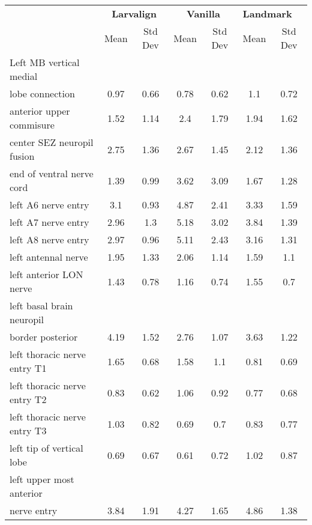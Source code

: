 \begin{tabular}{lcccccc}
\hline
 ﻿                                           & \multicolumn{2}{c}{\textbf{Larvalign}} & \multicolumn{2}{c}{\textbf{Vanilla}} & \multicolumn{2}{l}{\textbf{Landmark}} \\
                                             & Mean      & Std Dev  & Mean  & Std Dev  & Mean     & Std Dev  \\ \hline
 Left MB vertical medial\\ lobe connection   & 0.97      & 0.66 & 0.78    & 0.62 & 1.1      & 0.72 \\
 anterior upper commisure                    & 1.52      & 1.14 & 2.4     & 1.79 & 1.94     & 1.62 \\
 center SEZ neuropil fusion                  & 2.75      & 1.36 & 2.67    & 1.45 & 2.12     & 1.36 \\
 end of ventral nerve cord                   & 1.39      & 0.99 & 3.62    & 3.09 & 1.67     & 1.28 \\
 left A6 nerve entry                         & 3.1       & 0.93 & 4.87    & 2.41 & 3.33     & 1.59 \\
 left A7 nerve entry                         & 2.96      & 1.3  & 5.18    & 3.02 & 3.84     & 1.39 \\
 left A8 nerve entry                         & 2.97      & 0.96 & 5.11    & 2.43 & 3.16     & 1.31 \\
 left antennal nerve                         & 1.95      & 1.33 & 2.06    & 1.14 & 1.59     & 1.1  \\
 left anterior LON nerve                     & 1.43      & 0.78 & 1.16    & 0.74 & 1.55     & 0.7  \\
 left basal brain neuropil\\ border posterior  & 4.19      & 1.52 & 2.76    & 1.07 & 3.63     & 1.22 \\
 left thoracic nerve entry T1                & 1.65      & 0.68 & 1.58    & 1.1  & 0.81     & 0.69 \\
 left thoracic nerve entry T2                & 0.83      & 0.62 & 1.06    & 0.92 & 0.77     & 0.68 \\
 left thoracic nerve entry T3                & 1.03      & 0.82 & 0.69    & 0.7  & 0.83     & 0.77 \\
 left tip of vertical lobe                   & 0.69      & 0.67 & 0.61    & 0.72 & 1.02     & 0.87 \\
 left upper most anterior\\ nerve entry        & 3.84      & 1.91 & 4.27    & 1.65 & 4.86     & 1.38 \\

\end{tabular}
